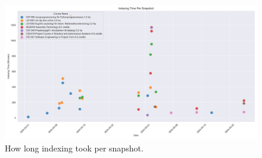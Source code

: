 \begin{figure}[H]
    \centering
    \includegraphics[width=\textwidth]{results/plots/assets/performance-03-index-time.png}
    \caption{How long indexing took per snapshot.}
    \label{fig:performance_03_index_time}
\end{figure}